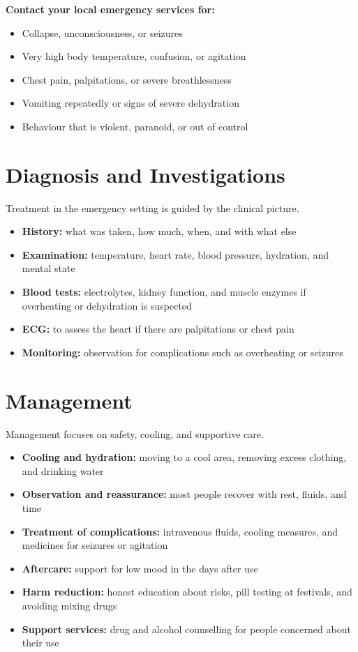 \textbf{Contact your local emergency services for:}
\begin{itemize}
    \item Collapse, unconsciousness, or seizures
    \item Very high body temperature, confusion, or agitation
    \item Chest pain, palpitations, or severe breathlessness
    \item Vomiting repeatedly or signs of severe dehydration
    \item Behaviour that is violent, paranoid, or out of control
\end{itemize}

\section*{Diagnosis and Investigations}
Treatment in the emergency setting is guided by the clinical picture.
\begin{itemize}
    \item \textbf{History:} what was taken, how much, when, and with what else
    \item \textbf{Examination:} temperature, heart rate, blood pressure, hydration, and mental state
    \item \textbf{Blood tests:} electrolytes, kidney function, and muscle enzymes if overheating or dehydration is suspected
    \item \textbf{ECG:} to assess the heart if there are palpitations or chest pain
    \item \textbf{Monitoring:} observation for complications such as overheating or seizures
\end{itemize}

\section*{Management}
Management focuses on safety, cooling, and supportive care.
\begin{itemize}
    \item \textbf{Cooling and hydration:} moving to a cool area, removing excess clothing, and drinking water
    \item \textbf{Observation and reassurance:} most people recover with rest, fluids, and time
    \item \textbf{Treatment of complications:} intravenous fluids, cooling measures, and medicines for seizures or agitation
    \item \textbf{Aftercare:} support for low mood in the days after use
    \item \textbf{Harm reduction:} honest education about risks, pill testing at festivals, and avoiding mixing drugs
    \item \textbf{Support services:} drug and alcohol counselling for people concerned about their use
\end{itemize}

